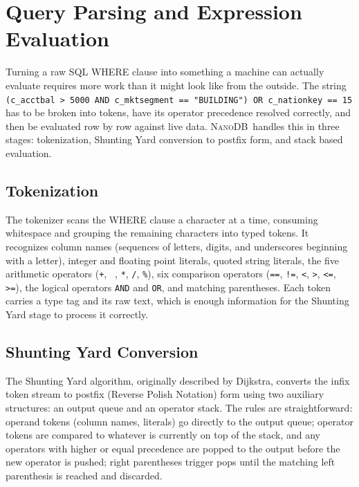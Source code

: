 \documentclass[conference]{IEEEtran}
\newcommand{\NanoDB}{\textsc{NanoDB}}
\newcommand{\code}[1]{\texttt{#1}}
\begin{document}
\section{Query Parsing and Expression Evaluation}

Turning a raw SQL WHERE clause into something a machine can actually evaluate
requires more work than it might look like from the outside. The string
\code{(c\_acctbal > 5000 AND c\_mktsegment == "BUILDING") OR c\_nationkey == 15}
has to be broken into tokens, have its operator precedence resolved correctly, and
then be evaluated row by row against live data. \NanoDB\ handles this in three
stages: tokenization, Shunting Yard conversion to postfix form, and stack based
evaluation.

\subsection{Tokenization}

The tokenizer scans the WHERE clause a character at a time, consuming whitespace
and grouping the remaining characters into typed tokens. It recognizes column
names (sequences of letters, digits, and underscores beginning with a letter),
integer and floating point literals, quoted string literals, the five arithmetic
operators (\code{+}, \code{ }, \code{*}, \code{/}, \code{\%}), six comparison
operators (\code{==}, \code{!=}, \code{<}, \code{>}, \code{<=}, \code{>=}), the
logical operators \code{AND} and \code{OR}, and matching parentheses. Each token
carries a type tag and its raw text, which is enough information for the
Shunting Yard stage to process it correctly.

\subsection{Shunting Yard Conversion}

The Shunting Yard algorithm, originally described by Dijkstra, converts the
infix token stream to postfix (Reverse Polish Notation) form using two
auxiliary structures: an output queue and an operator stack. The rules are
straightforward: operand tokens (column names, literals) go directly to the
output queue; operator tokens are compared to whatever is currently on top of the
stack, and any operators with higher or equal precedence are popped to the output
before the new operator is pushed; right parentheses trigger pops until the
matching left parenthesis is reached and discarded.
\end{document}
